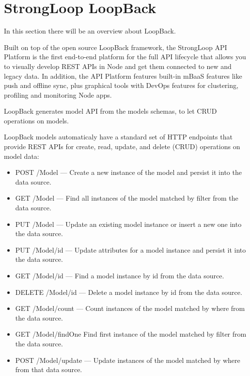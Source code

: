\section{StrongLoop LoopBack}
\label{sec:TCH_loopback}

In this section there will be an overview about LoopBack.

Built on top of the open source LoopBack framework, the StrongLoop API Platform is the first end-to-end platform for the full API lifecycle that allows you to visually develop REST APIs in Node and get them connected to new and legacy data. In addition, the API Platform features built-in mBaaS features like push and offline sync, plus graphical tools with DevOps features for clustering, profiling and monitoring Node apps.

LoopBack generates model API from the models schemas, to let CRUD operations on models.

LoopBack models automaticaly have a standard set of HTTP endpoints that provide REST APIs for create, read, update, and delete (CRUD) operations on model data:
\begin{itemize}
\item POST /Model — Create a new instance of the model and persist it into the data source.
\item GET /Model — Find all instances of the model matched by filter from the data source.
\item PUT /Model — Update an existing model instance or insert a new one into the data source.
\item PUT /Model/{id} — Update attributes for a model instance and persist it into the data source.
\item GET /Model/{id} — Find a model instance by id from the data source.
\item DELETE /Model/{id} — Delete a model instance by id from the data source.
\item GET /Model/count — Count instances of the model matched by where from the data source.
\item GET /Model/findOne Find first instance of the model matched by filter from the data source.
\item POST /Model/update — Update instances of the model matched by where from that data source.
\end{itemize}


